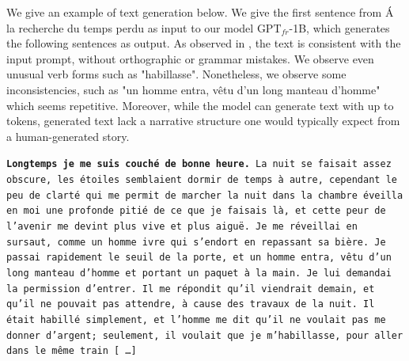 We give an example of text generation below. We give the first sentence from \'{A} la recherche du temps perdu as input to our model $\text{GPT}_{fr}$-1B, which generates the following sentences as output. As observed in \textcite{linzen_2020}, the text is consistent with the input prompt, without orthographic or grammar mistakes. We observe even unusual verb forms such as "habillasse". Nonetheless, we observe some inconsistencies, such as "un homme entra, vêtu d'un long manteau d'homme" which seems repetitive. Moreover, while the model can generate text with up to  tokens, generated text lack a narrative structure one would typically expect from a human-generated story.


\texttt{\textbf{Longtemps je me suis couch\'{e} de bonne heure.} La nuit se faisait assez obscure, les \'{e}toiles semblaient dormir de temps à autre, cependant le peu de clart\'{e} qui me permit de marcher la nuit dans la chambre \'{e}veilla en moi une profonde piti\'{e} de ce que je faisais l\`{a}, et cette peur de l'avenir me devint plus vive et plus aigu\"{e}. Je me r\'{e}veillai en sursaut, comme un homme ivre qui s'endort en repassant sa bi\`{e}re. Je passai rapidement le seuil de la porte, et un homme entra, v\^{e}tu d'un long manteau d'homme et portant un paquet à la main. Je lui demandai la permission d'entrer. Il me r\'{e}pondit qu'il viendrait demain, et qu'il ne pouvait pas attendre, à cause des travaux de la nuit. Il \'{e}tait habill\'{e} simplement, et l'homme me dit qu'il ne voulait pas me donner d'argent; seulement, il voulait que je m'habillasse, pour aller dans le même train \textup{[\,\dots]}}


